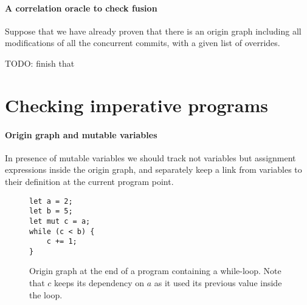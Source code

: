 \documentclass[a4paper,10pt]{article}
\begin{document}
\paragraph{A correlation oracle to check fusion} Suppose that we have already proven that there is an origin graph including all modifications of all the concurrent commits, with a given list of overrides.

TODO: finish that

\section{Checking imperative programs}

\paragraph{Origin graph and mutable variables} In presence of mutable variables we should track not variables but assignment expressions inside the origin graph, and separately keep a link from variables to their definition at the current program point.

\begin{figure}[ht]
\begin{minipage}{.5\textwidth}
\begin{lstlisting}
let a = 2;
let b = 5;
let mut c = a;
while (c < b) {
    c += 1;
}
\end{lstlisting}
\end{minipage}\hfill
\begin{minipage}{.45\textwidth}
\centering{}
\end{minipage}
\caption{Origin graph at the end of a program containing a while-loop. Note that $c$ keeps its dependency on $a$ as it used its previous value inside the loop.}
\end{figure}
\end{document}
